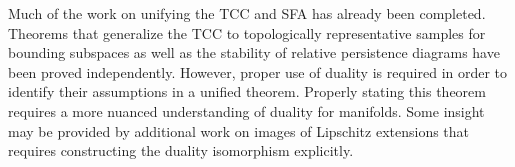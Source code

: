 
Much of the work on unifying the TCC and SFA has already been completed.
Theorems that generalize the TCC to topologically representative samples for bounding subspaces as well as the stability of relative persistence diagrams have been proved independently.
However, proper use of duality is required in order to identify their assumptions in a unified theorem.
Properly stating this theorem requires a more nuanced understanding of duality for manifolds.
Some insight may be provided by additional work on images of Lipschitz extensions that requires constructing the duality isomorphism explicitly.
